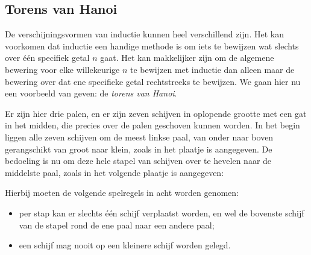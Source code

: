\subsection*{Torens van Hanoi}
De verschijningsvormen van inductie kunnen heel verschillend zijn. Het kan voorkomen dat inductie een handige methode is om iets te bewijzen wat slechts over \'e\'en specifiek getal $n$ gaat. Het kan makkelijker zijn om de algemene bewering voor elke willekeurige $n$ te bewijzen met inductie dan alleen maar de bewering over dat ene specifieke getal rechtstreeks te bewijzen. We gaan hier nu een voorbeeld van geven: de \textit{torens van Hanoi}.
\begin{center}
\end{center}
Er zijn hier drie palen, en er zijn zeven schijven in oplopende grootte met een gat in het midden, die precies over de palen geschoven kunnen worden. In het begin liggen alle zeven schijven om de meest linkse paal, van onder naar boven gerangschikt van groot naar klein, zoals in het plaatje is aangegeven. De bedoeling is nu om deze hele stapel van schijven over te hevelen naar de middelste paal, zoals in het volgende plaatje is aangegeven:
\begin{center}
\end{center}
Hierbij moeten de volgende spelregels in acht worden genomen:
\begin{itemize}
    \item per stap kan er slechts \'e\'en schijf verplaatst worden, en wel de bovenste schijf van de stapel rond de ene paal naar een andere paal;
    \item een schijf mag nooit op een kleinere schijf worden gelegd.
\end{itemize}
